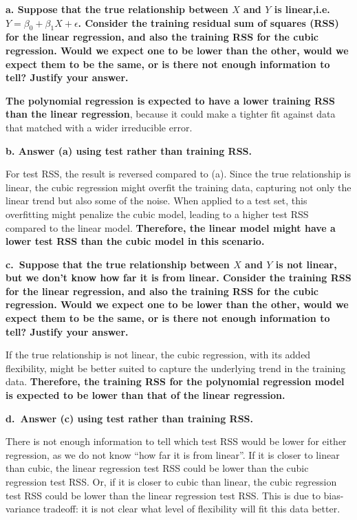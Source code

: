 \documentclass[
]{article}
\begin{document}
\textbf{a. Suppose that the true relationship between \(X\) and \(Y\) is
linear,i.e.~\(Y=\beta_{0}+\beta_{1} X+\epsilon\). Consider the training
residual sum of squares (RSS) for the linear regression, and also the
training RSS for the cubic regression. Would we expect one to be lower
than the other, would we expect them to be the same, or is there not
enough information to tell? Justify your answer.}

\textbf{The polynomial regression is expected to have a lower training
RSS than the linear regression}, because it could make a tighter fit
against data that matched with a wider irreducible error.

\textbf{b. Answer (a) using test rather than training RSS.}

For test RSS, the result is reversed compared to (a). Since the true
relationship is linear, the cubic regression might overfit the training
data, capturing not only the linear trend but also some of the noise.
When applied to a test set, this overfitting might penalize the cubic
model, leading to a higher test RSS compared to the linear model.
\textbf{Therefore, the linear model might have a lower test RSS than the
cubic model in this scenario.}

\textbf{c.~Suppose that the true relationship between \(X\) and \(Y\) is
not linear, but we don't know how far it is from linear. Consider the
training RSS for the linear regression, and also the training RSS for
the cubic regression. Would we expect one to be lower than the other,
would we expect them to be the same, or is there not enough information
to tell? Justify your answer.}

If the true relationship is not linear, the cubic regression, with its
added flexibility, might be better suited to capture the underlying
trend in the training data. \textbf{Therefore, the training RSS for the
polynomial regression model is expected to be lower than that of the
linear regression.}

\textbf{d.~Answer (c) using test rather than training RSS.}

There is not enough information to tell which test RSS would be lower
for either regression, as we do not know ``how far it is from linear''.
If it is closer to linear than cubic, the linear regression test RSS
could be lower than the cubic regression test RSS. Or, if it is closer
to cubic than linear, the cubic regression test RSS could be lower than
the linear regression test RSS. This is due to bias-variance tradeoff:
it is not clear what level of flexibility will fit this data better.
\end{document}
